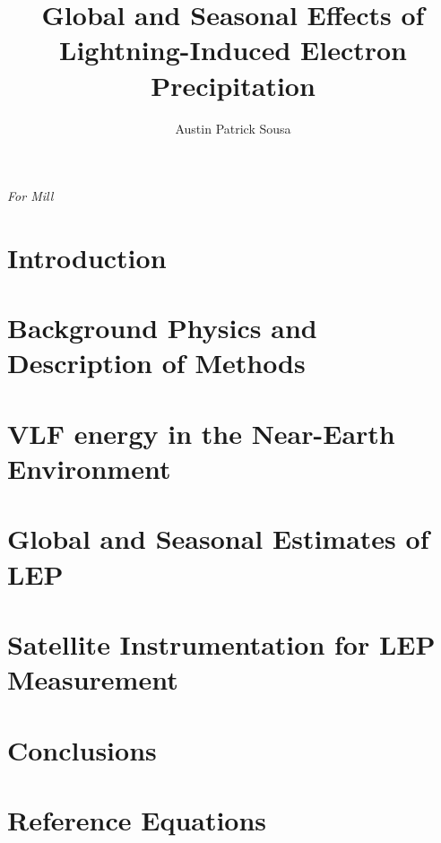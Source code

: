 \documentclass[12pt]{report}
\begin{document}
    \title{Global and Seasonal Effects of\\
            Lightning-Induced Electron Precipitation}
    \author{Austin Patrick Sousa}
    \beforepreface
    
    \clearpage
	\begin{center}
	\emph{For Mill}
	\end{center}
    
    
	
        
    \afterpreface
 
    \chapter{Introduction}
    	\label{chapter:introduction}
    	

    \chapter[Physics and Methods]{Background Physics and Description of Methods}
        \label{chapter:physics}
    	

    \chapter{VLF energy in the Near-Earth Environment}
        \label{chapter:power}
    	

    \chapter{Global and Seasonal Estimates of LEP}
        \label{chapter:global_estimates}
    	

    \chapter[Satellite Instrumentation]{Satellite Instrumentation for LEP Measurement}
        \label{chapter:VPM}
    	

    \chapter{Conclusions}
    	

   \appendix
   \chapter{Reference Equations}
    

    
    
\end{document}
